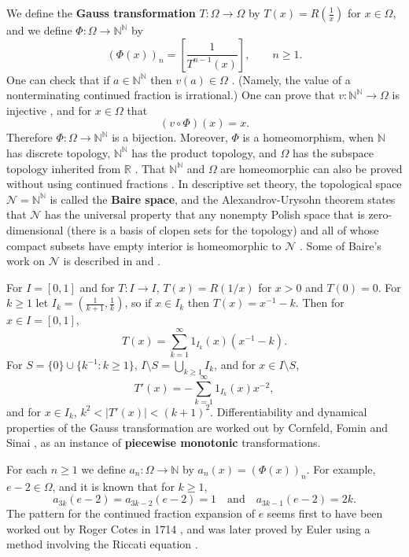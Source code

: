 \documentclass{amsart}
\begin{document}
We define the \textbf{Gauss transformation} $T:\Omega \to \Omega$ by
 $T(x)=R\left(\frac{1}{x}\right)$ for $x \in \Omega$, and we define $\Phi:\Omega \to \mathbb{N}^\mathbb{N}$ by
\[
(\Phi(x))_n=\left[ \frac{1}{T^{n-1}(x)} \right],\qquad n \geq 1.
\]
One can check that if $a \in \mathbb{N}^\mathbb{N}$ then $v(a) \in \Omega$ \cite[p.~73, Lemma 3.2]{einsiedler}. (Namely, the value of a nonterminating continued fraction is irrational.)
One can prove that $v:\mathbb{N}^\mathbb{N} \to \Omega$ is injective \cite[p.~75, Lemma 3.4]{einsiedler}, and
 for $x \in \Omega$ that \cite[p.~78, Lemma 3.6]{einsiedler}
 \[
 (v \circ \Phi)(x)=x.
 \]
 Therefore $\Phi:\Omega \to \mathbb{N}^\mathbb{N}$ is a bijection. Moreover,
 $\Phi$ is a homeomorphism, when $\mathbb{N}$ has discrete topology, $\mathbb{N}^\mathbb{N}$ has the product topology, and $\Omega$ has the subspace topology
 inherited from $\mathbb{R}$ \cite[p.~86, Exercise 3.2.2]{einsiedler}. That $\mathbb{N}^\mathbb{N}$ and $\Omega$ are homeomorphic
 can also be proved without using continued fractions \cite[p.~106, Theorem 3.68]{hitchhiker}.
 In descriptive set theory,
 the topological space $\mathscr{N}=\mathbb{N}^\mathbb{N}$
 is  called the \textbf{Baire space}, and the Alexandrov-Urysohn theorem states that $\mathscr{N}$ has the universal property  that any nonempty
 Polish space that is zero-dimensional (there is a basis of clopen sets for the topology) and all of whose compact subsets have empty
 interior is homeomorphic to $\mathscr{N}$  \cite[p.~37, Theorem 7.7]{kechris}.
 Some of Baire's work on $\mathscr{N}$ is described in \cite[pp.~119--120]{johnson} and \cite[pp.~349, 372]{arboleda}.

For $I=[0,1]$ and for $T:I \to I$, $T(x)=R(1/x)$ for $x>0$ and $T(0)=0$. For $k \geq 1$ let 
$I_k = \left( \frac{1}{k+1},\frac{1}{k} \right)$, so if $x \in I_k$ then $T(x) = x^{-1}-k$. Then for
$x \in I=[0,1]$,
\[
T(x) = \sum_{k=1}^\infty 1_{I_k}(x) (x^{-1}-k).
\]
For $S = \{0\} \cup \{k^{-1} : k \geq 1\}$, $I \setminus S = \bigcup_{k \geq 1} I_k$, and for $x \in I \setminus S$,
\[
T'(x) = - \sum_{k=1}^\infty 1_{I_k}(x) x^{-2},
\]
and for $x \in I_k$, $k^2 < |T'(x)| < (k+1)^2$. Differentiability and dynamical properties of the Gauss transformation are worked out
by Cornfeld, Fomin and Sinai \cite[pp.~165--177, Chapter 7, \S 4]{cornfeld},
as an instance of \textbf{piecewise monotonic} transformations.




For each $n \geq 1$ we define $a_n:\Omega \to \mathbb{N}$ by $a_n(x)=(\Phi(x))_n$.
For example, $e-2 \in \Omega$, and it is known \cite[p.~74, Theorem 2]{MR0209227} 
that for $k \geq 1$,
\[
a_{3k}(e-2)=a_{3k-2}(e-2)=1 \quad \textrm{and} \quad a_{3k-1}(e-2)=2k.
\]
The pattern for the continued fraction expansion of $e$ seems first to have been worked out by
Roger Cotes in 1714 \cite{fowler1992}, and was  later proved by Euler using a method involving the Riccati equation \cite{cretney}.
\end{document}
